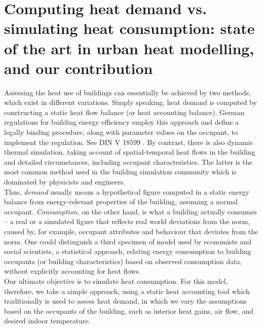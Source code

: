 \documentclass[11pt]{IJM-article}
\begin{document}
\section{Computing heat demand vs. simulating heat consumption: state of the
art in urban heat modelling, and our contribution }
\label{sec:4}

Assessing the heat use of buildings can essentially be achieved by two methods,
which exist in different variations. Simply speaking, heat demand is computed
by constructing a static heat flow balance (or heat accounting balance). German
regulations for building energy efficiency employ this approach and define a
legally binding procedure, along with parameter values on the occupant, to
implement the regulation. See DIN V 18599  .  By contrast,
there is also dynamic thermal simulation, taking account of spatial-temporal
heat flows in the building and detailed circumstances, including occupant
characteristics. The latter is the most common method used in the building
simulation community  which is dominated by physicists and
engineers.\\

Thus, \textit{demand} usually means a hypothetical figure computed in a static
energy balance from energy-relevant properties of the building, assuming a
normal occupant. \textit{Consumption}, on the other hand, is what a building
actually consumes -- a real or a simulated figure that reflects real world
deviations from the norm, caused by, for example, occupant attributes and
behaviour that deviates from the norm. One could distinguish a third specimen
of model used by economists and social scientists, a statistical approach,
relating energy consumption to building occupants (or building characteristics)
based on observed consumption data, without explicitly accounting for heat
flows.\\

Our ultimate objective is to simulate heat consumption. For this model,
therefore, we take a simple approach, using a static heat accounting tool which
traditionally is used to assess heat demand, in which we vary the assumptions
based on the occupants of the building, such as interior heat gains, air flow,
and desired indoor temperature.\\
\end{document}
